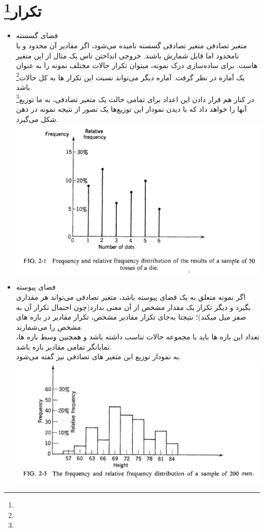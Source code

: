 \documentclass[12pt,onecolumn,a4paper]{article}
\begin{document}
\section{تکرار\footnote{}}
\begin{itemize}
    \item فضای گسسته \\
        متغیر تصادفی  متغیر تصادفی گسسته نامیده می‌شود، اگر مقادیر آن محدود و یا نامحدود اما قابل شمارش باشند. خروجی انداختن تاس یک مثال از این متغیر هاست. برای ساده‌سازی درک نمونه، میتوان تکرار حالات مختلف نمونه را به عنوان یک آماره در نظر گرفت. آماره دیگر می‌تواند نسبت این تکرار ها به کل حالات\footnote{} باشد. \\
        در کنار هم قرار دادن این اعداد برای تمامی حالت یک متغیر تصادفی، به ما توزیع\footnote{} آنها را خواهد داد که با دیدن نمودار این توزیع‌ها یک تصور از نتیجه نمونه در ذهن شکل می‌گیرد. \\
        \includegraphics[width=\textwidth]{fig1.png}
    \item فضای پیوسته \\
        اگر نمونه متعلق به یک فضای پیوسته باشد، متغیر تصادفی  می‌تواند هر مقداری بگیرد و دیگر تکرار یک مقدار مشخص از آن معنی ندارد(چون احتمال تکرار آن به صفر میل میکند)؛ نتیجتا به‌جای تکرار مقادیر مشخص، تکرار مقادیر در بازه های مشخص را می‌شمارند.\\
        تعداد این بازه ها باید با مجموعه حالات تناسب داشته باشد و همچنین وسط بازه ها، نمایانگر تمامی مقادیر بازه باشد.\\
        به نمودار توزیع این متغیر های تصادفی  نیز گفته می‌شود. \\
        \includegraphics[width=\textwidth]{fig2.png}

\end{itemize}
\end{document}
